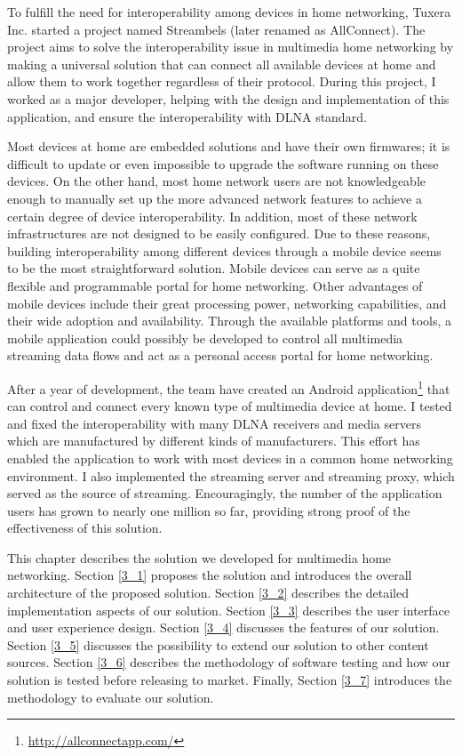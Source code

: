 
To fulfill the need for interoperability among devices in home networking,
Tuxera Inc. started a project named Streambels (later renamed as AllConnect).
The project aims to solve the interoperability issue in multimedia home networking
by making a universal solution that can connect all available devices at home
and allow them to work together regardless of their protocol. During this
project, I worked as a major developer, helping with the design and
implementation of this application, and ensure the interoperability with DLNA
standard.

Most devices at home are embedded solutions and have their own firmwares; it is
difficult to update or even impossible to upgrade the software running on these
devices. On the other hand, most home network users are not knowledgeable
enough to manually set up the more advanced network features to achieve a
certain degree of device interoperability. In addition, most of these network
infrastructures are not designed to be easily configured. Due to these reasons,
building interoperability among different devices through a mobile device seems
to be the most straightforward solution. Mobile devices can serve as a quite
flexible and programmable portal for home networking.  Other advantages of
mobile devices include their great processing power, networking capabilities,
and their wide adoption and availability. Through the available platforms and
tools, a mobile application could possibly be developed to control all
multimedia streaming data flows and act as a personal access portal for home
networking.

After a year of development, the team have created an Android
application\footnote{\url{http://allconnectapp.com/}} that can control and
connect every known type of multimedia device at home. I tested and fixed the
interoperability with many DLNA receivers and media servers which are
manufactured by different kinds of manufacturers. This effort has enabled the
application to work with most devices in a common home networking environment. I
also implemented the streaming server and streaming proxy, which served as the
source of streaming. Encouragingly, the number of the application users has
grown to nearly one million so far, providing strong proof of the effectiveness
of this solution.

This chapter describes the solution we developed for multimedia home networking.
Section \ref{3_1} proposes the solution and introduces the overall architecture
of the proposed solution. Section \ref{3_2} describes the detailed
implementation aspects of our solution. Section \ref{3_3} describes the user
interface and user experience design. Section \ref{3_4} discusses the features
of our solution. Section \ref{3_5} discusses the possibility to extend our
solution to other content sources. Section \ref{3_6} describes the methodology
of software testing and how our solution is tested before releasing to market.
Finally, Section \ref{3_7} introduces the methodology to evaluate our solution.

